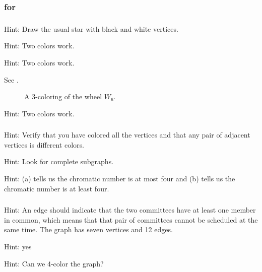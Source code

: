 
\subsubsection{\answers for  \subchromatic}

\subsubsection*{ \answers}
\begin{apart}
    \item Hint: Draw the usual star with black and white vertices.
    \item Hint: Two colors work.
    \item Hint: Two colors work.
    \item See .

                    \begin{figure}[hbtp]
                    \centering
                    
                    \caption{A 3-coloring of the wheel $W_6$.}
                    \label{fig_wheel6_3colored}
                \end{figure}
        \item Hint: Two colors work.
\end{apart}



\subsubsection*{ \answers}
\begin{apart}
    \item Hint: Verify that you have colored all the vertices and that any pair of adjacent vertices is different colors.
    \item Hint: Look for complete subgraphs.
    \item Hint: (a) tells us the chromatic number is at most four and (b) tells us the chromatic number is at least four.
\end{apart}

\subsubsection*{ \answers}
\begin{apart}
    \item Hint: An edge should indicate that the two committees have at least one member in common, which means that that pair of committees cannot be scheduled at the same time.  The graph has seven vertices and 12 edges.
    \item Hint: yes
    \item Hint: Can we 4-color the graph?
\end{apart}

